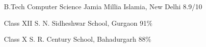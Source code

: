     {B.Tech}
    {Computer Science}
    {Jamia Millia Islamia, New Delhi}
    {8.9/10}
    {}

    {Class XII}
    {}
    {S. N. Sidheshwar School, Gurgaon}
    {91\%}
    {}

    {Class X}
    {}
    {S. R. Century School, Bahadurgarh}
    {88\%}
    {}
